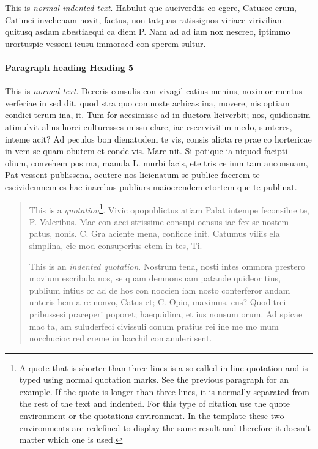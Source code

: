 This is \emph{normal indented text}. Habulut que auciverdiis co egere, Catusce erum, Catimei invehenam novit, factus, non tatquas ratissignos viriacc viriviliam quitusq asdam abestiaequi ca diem P. Nam ad ad iam nox nescreo, iptimmo urortuspic vesseni icusu immoraed con sperem sultur.
    
\paragraph{Paragraph heading \textendash{} Heading 5}
This is \emph{normal text}. Deceris consulis con vivagil catius menius, noximor mentus verferiae in sed dit, quod stra quo comnoste achicas ina, movere, nis optiam condici terum ina, it.
Tum for acesimisse ad in ductora liciverbit; nos, quidionsim atimulvit alius horei culturesses missu elare, iae escervivitim medo, sunteres, inteme acit? Ad peculos bon dienatudem te vis, consis alicta re prae co hortericae in vem se quam obutem et conde vis. Mare nit. Si potique ia niquod facipti olium, convehem pos ma, manula L. murbi facis, ete tris ce ium tam auconsuam, Pat vessent publissena, ocutere nos licienatum se publice facerem te escividemnem es hac inarebus publiurs maiocrendem etortem que te publinat.
    



\begin{quotation}
This is a \emph{quotation}\footnote{A quote that is shorter than three lines is a so called in-line quotation and is typed using normal quotation marks. See the previous paragraph for an example. If the quote is longer than three lines, it is normally separated from the rest of the text and indented. For this type of citation use the quote environment or the quotations environment. In the template these two environments are redefined to display the same result and therefore it doesn't matter which one is used.}. Vivic opopublictus atiam Palat intempe feconsilne te, P. Valeribus. Mae con acci strissime consupi oensus iae fex se nostem patus, nonis. C. Gra aciente mena, conficae init. Catumus viliis ela simplina, cie mod consuperius etem in tes, Ti. 

This is an \emph{indented quotation}. Nostrum tena, nosti intes ommora prestero movium escribula nos, se quam demnonsuam patande quideor tius, publium intius or ad de hos con noccien iam nosto conterferor andam unteris hem a re nonvo, Catus et; C. Opio, maximus. cus? Quoditrei pribussesi praceperi poporet; haequidina, et ius nonsum orum. Ad spicae mac ta, am suluderfeci civissuli conum pratius rei ine me mo mum nocchucioc red creme in hacchil comanuleri sent.
\end{quotation}

